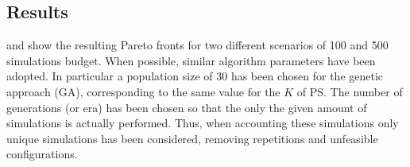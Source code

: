 \subsection{Results}

 and  show the resulting Pareto fronts for two
different scenarios of 100 and 500 simulations budget.  When possible,
similar algorithm parameters have been adopted. In particular a
population size of 30 has been chosen for the genetic approach (GA), corresponding to the
same value for the $K$ of PS.  The number of generations (or era)
has been chosen so that the only the given amount of simulations is
actually performed. Thus, when accounting these simulations only unique simulations
has been considered, removing repetitions and unfeasible
configurations.

%

